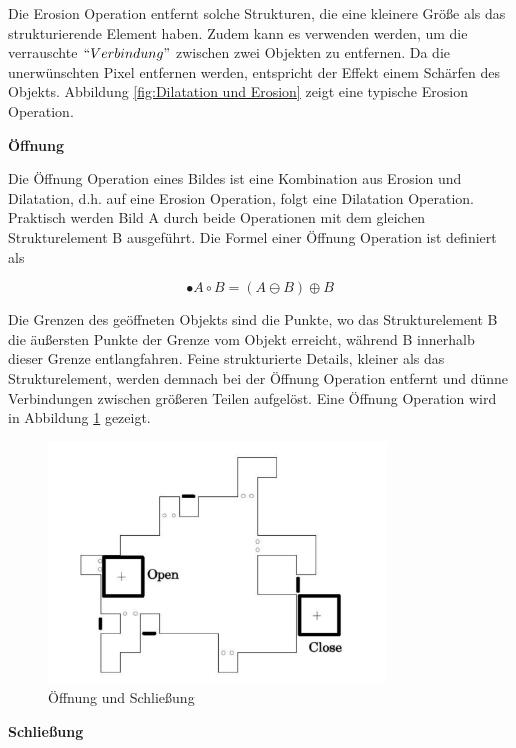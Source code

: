 Die Erosion Operation entfernt solche Strukturen, die eine kleinere Größe als das strukturierende Element haben. Zudem kann es verwenden werden, um die verrauschte $ ``Verbindung" $ zwischen zwei Objekten zu entfernen. Da die unerwünschten Pixel entfernen werden, entspricht der Effekt einem Schärfen des Objekts. Abbildung \ref{fig:Dilatation und Erosion} zeigt eine typische Erosion Operation.


\textbf{Öffnung}

Die Öffnung Operation eines Bildes ist eine Kombination aus Erosion und Dilatation, d.h. auf eine Erosion Operation, folgt eine Dilatation Operation. Praktisch werden Bild A durch beide Operationen mit dem gleichen Strukturelement B ausgeführt. Die Formel einer Öffnung Operation ist definiert als

\begin{equation}
•A \circ B =( A \ominus B )\oplus B  
\end{equation}

Die Grenzen des geöffneten Objekts sind die Punkte, wo das Strukturelement B die äußersten Punkte der Grenze vom Objekt erreicht, während B innerhalb dieser Grenze entlangfahren. Feine strukturierte Details,
kleiner als das Strukturelement, werden demnach bei der Öffnung Operation entfernt und dünne Verbindungen zwischen größeren Teilen aufgelöst. Eine Öffnung Operation wird in Abbildung \ref{fig:oeffnungundschliessung} gezeigt.

\begin{figure}[H]
 \centering 
  \includegraphics[keepaspectratio,width=0.8\textwidth]{images/4_ZweiteErfahrung/Morphological/oeffnungundschliessung.pdf}
 \caption{Öffnung und Schließung}
 \label{fig:oeffnungundschliessung}
\end{figure} 

\textbf{Schließung}

